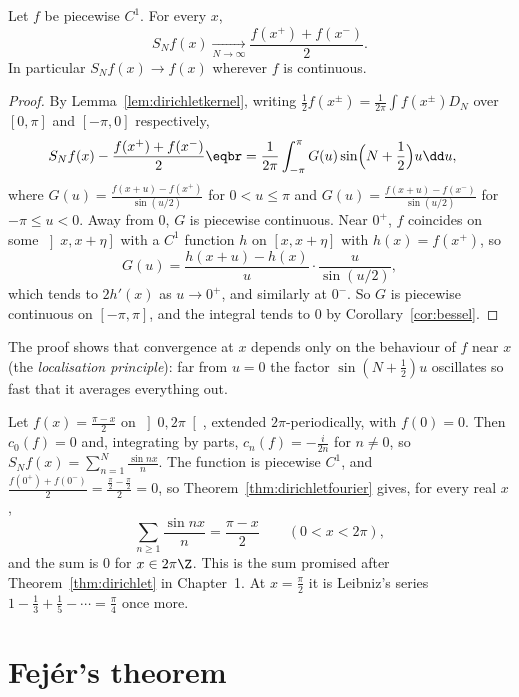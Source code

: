 \begin{theorem}[Dirichlet, 1829]\label{thm:dirichletfourier}
Let $f$ be piecewise $C^1$. For every $x$,
\[
S_Nf(x)\xrightarrow[N\to\infty]{}\frac{f(x^+)+f(x^-)}2.
\]
In particular $S_Nf(x)\to f(x)$ wherever $f$ is continuous.
\end{theorem}
\begin{proof}
By Lemma~\ref{lem:dirichletkernel}, writing $\frac12f(x^\pm)=\frac1{2\pi}\int f(x^\pm)D_N$ over $[0,\pi]$ and $[-\pi,0]$ respectively,
\[
\begin{aligned}S_Nf(x)&-\frac{f(x^+)+f(x^-)}2\eqbr=\frac1{2\pi}\int_{-\pi}^\pi G(u)\sin\Bigl(N+\frac12\Bigr)u\dd u,\end{aligned}
\]
where $G(u)=\frac{f(x+u)-f(x^+)}{\sin(u/2)}$ for $0<u\le\pi$ and $G(u)=\frac{f(x+u)-f(x^-)}{\sin(u/2)}$ for $-\pi\le u<0$. Away from $0$, $G$ is
piecewise continuous. Near $0^+$, $f$ coincides on some $\left]x,x+\eta\right]$ with a $C^1$ function $h$ on $[x,x+\eta]$ with $h(x)=f(x^+)$, so
\[
G(u)=\frac{h(x+u)-h(x)}u\cdot\frac u{\sin(u/2)},
\]
which tends to $2h'(x)$ as $u\to0^+$, and similarly at $0^-$. So $G$ is piecewise continuous on $[-\pi,\pi]$, and the integral tends to $0$ by Corollary~\ref{cor:bessel}.
\end{proof}

The proof shows that convergence at $x$ depends only on the behaviour of $f$ near $x$ (the \emph{localisation principle}):
far from $u=0$ the factor $\sin(N+\frac12)u$ oscillates so fast that it averages everything out.

\begin{example}\label{ex:sawtooth}
Let $f(x)=\frac{\pi-x}2$ on $\left]0,2\pi\right[$, extended $2\pi$-periodically, with $f(0)=0$. Then $c_0(f)=0$ and, integrating by parts,
$c_n(f)=-\frac i{2n}$ for $n\ne0$, so $S_Nf(x)=\sum_{n=1}^N\frac{\sin nx}n$. The function is piecewise $C^1$, and $\frac{f(0^+)+f(0^-)}2=\frac{\frac\pi2-\frac\pi2}2=0$,
so Theorem~\ref{thm:dirichletfourier} gives, for every real $x$,
\[
\sum_{n\ge1}\frac{\sin nx}n=\frac{\pi-x}2\qquad(0<x<2\pi),
\]
and the sum is $0$ for $x\in2\pi\Z$.
This is the sum promised after Theorem~\ref{thm:dirichlet} in Chapter~1. At $x=\frac\pi2$ it is Leibniz's series
$1-\frac13+\frac15-\cdots=\frac\pi4$ once more.
\end{example}

\section{Fej\'er's theorem}

